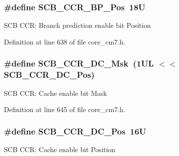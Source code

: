 \subsubsection[{\texorpdfstring{S\+C\+B\+\_\+\+C\+C\+R\+\_\+\+B\+P\+\_\+\+Pos}{SCB_CCR_BP_Pos}}]{\setlength{\rightskip}{0pt plus 5cm}\#define S\+C\+B\+\_\+\+C\+C\+R\+\_\+\+B\+P\+\_\+\+Pos~18U}\hypertarget{group___c_m_s_i_s___s_c_b_ga2a729c850e865d602bbf25852c7d44fe}{}\label{group___c_m_s_i_s___s_c_b_ga2a729c850e865d602bbf25852c7d44fe}
S\+CB C\+CR\+: Branch prediction enable bit Position 

Definition at line 638 of file core\+\_\+cm7.\+h.

\subsubsection[{\texorpdfstring{S\+C\+B\+\_\+\+C\+C\+R\+\_\+\+D\+C\+\_\+\+Msk}{SCB_CCR_DC_Msk}}]{\setlength{\rightskip}{0pt plus 5cm}\#define S\+C\+B\+\_\+\+C\+C\+R\+\_\+\+D\+C\+\_\+\+Msk~(1\+U\+L $<$$<$ S\+C\+B\+\_\+\+C\+C\+R\+\_\+\+D\+C\+\_\+\+Pos)}\hypertarget{group___c_m_s_i_s___s_c_b_ga57b3909dff40a9c28ec50991e4202678}{}\label{group___c_m_s_i_s___s_c_b_ga57b3909dff40a9c28ec50991e4202678}
S\+CB C\+CR\+: Cache enable bit Mask 

Definition at line 645 of file core\+\_\+cm7.\+h.

\subsubsection[{\texorpdfstring{S\+C\+B\+\_\+\+C\+C\+R\+\_\+\+D\+C\+\_\+\+Pos}{SCB_CCR_DC_Pos}}]{\setlength{\rightskip}{0pt plus 5cm}\#define S\+C\+B\+\_\+\+C\+C\+R\+\_\+\+D\+C\+\_\+\+Pos~16U}\hypertarget{group___c_m_s_i_s___s_c_b_gaa1896a99252649cfb96139b56ba87d9b}{}\label{group___c_m_s_i_s___s_c_b_gaa1896a99252649cfb96139b56ba87d9b}
S\+CB C\+CR\+: Cache enable bit Position 

